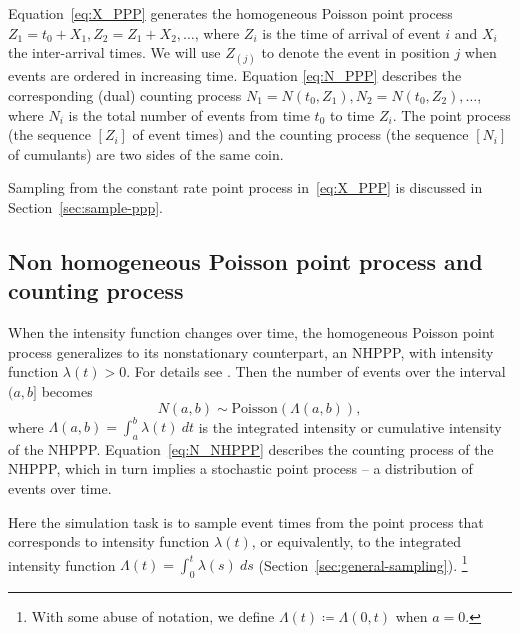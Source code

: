 \documentclass[article]{jss}\usepackage[]{graphicx}\usepackage[]{xcolor}
\begin{document}
Equation~\eqref{eq:X_PPP} generates the homogeneous Poisson point process ${Z_1 = t_0 + X_1, Z_2 = Z_1 + X_2, \dots}$, where $Z_i$ is the time of arrival of event $i$ and $X_i$ the inter-arrival times. We will use $Z_{(j)}$ to denote the event in position $j$ when events are ordered in increasing time.
%
Equation \eqref{eq:N_PPP} describes the corresponding (dual) counting process
${N_1 = N(t_0, Z_1)}, {N_2 = N(t_0, Z_2), \dots}$, where $N_i$ is the total number of events from time $t_0$ to time $Z_i$. The point process (the sequence $[Z_i]$ of event times) and the counting process (the sequence $[N_i]$ of cumulants) are two sides of the same coin.

Sampling from the constant rate point process in~\eqref{eq:X_PPP} is discussed in Section~\ref{sec:sample-ppp}.


\subsection{Non homogeneous Poisson point process and counting process}\label{sec:nhppp-intro}
When the intensity function changes over time, the homogeneous Poisson point process generalizes to its nonstationary counterpart, an NHPPP, with intensity function $\lambda(t) > 0$. For details see \citet[par 4.2]{cox1965theory}. Then the number of events over the interval $(a, b]$ becomes
\begin{equation}\label{eq:N_NHPPP}
N(a, b) \sim \text{Poisson}(\Lambda(a, b)),
\end{equation}
where $\Lambda(a, b) = \int_a^b \lambda(t) \ dt$ is the integrated intensity or cumulative intensity of the NHPPP. Equation~\eqref{eq:N_NHPPP} describes the counting process of the NHPPP, which in turn implies a stochastic point process -- a distribution of events over time.

Here the simulation task is to sample event times from the point process that corresponds to intensity function $\lambda(t)$, or equivalently, to the integrated intensity function $\Lambda(t) = \int_0^t \lambda(s) \ ds$ (Section~\ref{sec:general-sampling}).%
\footnote{With some abuse of notation, we define $\Lambda(t) \coloneqq \Lambda(0, t)$ when  $a=0$.}
\end{document}
